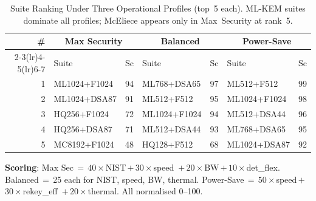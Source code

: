 \begin{table}[!t]
\centering
\caption{Suite Ranking Under Three Operational Profiles (top~5 each).
ML-KEM suites dominate all profiles; McEliece appears only in
Max~Security at rank~5.}
\label{tab:sched_profiles}
\footnotesize
\setlength{\tabcolsep}{2.5pt}
\begin{tabular}{@{}r l r @{\quad} l r @{\quad} l r@{}}
\toprule
\textbf{\#}
 & \multicolumn{2}{c}{\textbf{Max Security}}
 & \multicolumn{2}{c}{\textbf{Balanced}}
 & \multicolumn{2}{c}{\textbf{Power-Save}} \\
\cmidrule(lr){2-3}\cmidrule(lr){4-5}\cmidrule(lr){6-7}
 & Suite & Sc & Suite & Sc & Suite & Sc \\
\midrule
1 & ML1024+F1024 & 94 & ML768+DSA65  & 97 & ML512+F512   & 99 \\
2 & ML1024+DSA87 & 91 & ML512+F512   & 95 & ML1024+F1024 & 98 \\
3 & HQ256+F1024  & 72 & ML1024+F1024 & 94 & ML512+DSA44  & 96 \\
4 & HQ256+DSA87  & 71 & ML512+DSA44  & 93 & ML768+DSA65  & 95 \\
5 & MC8192+F1024 & 48 & HQ128+F512   & 68 & ML1024+DSA87 & 92 \\
\bottomrule
\end{tabular}
\begin{flushleft}
\footnotesize
\textbf{Scoring}: Max Sec\,$=$\,$40{\times}$NIST\,$+$\,$30{\times}$speed
\,$+$\,$20{\times}$BW\,$+$\,$10{\times}$det\_flex.
Balanced\,$=$\,25 each for NIST, speed, BW, thermal.
Power-Save\,$=$\,$50{\times}$speed\,$+$\,$30{\times}$rekey\_eff
\,$+$\,$20{\times}$thermal.  All normalised 0--100.
\end{flushleft}
\end{table}

